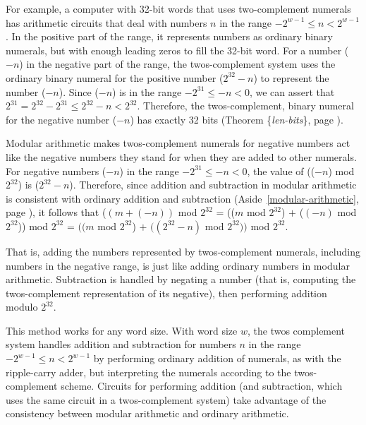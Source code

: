 For example, a computer with
32-bit words that uses
two-complement numerals has arithmetic circuits that
deal with numbers $n$ in the range $-2^{w-1} \leq n < 2^{w-1}$.
In the positive part of the range, it represents numbers as
ordinary binary numerals, but with enough leading zeros
to fill the 32-bit word.
For a number ($-n$) in the negative part of the range,
the twos-complement system uses the ordinary binary numeral
for the positive number ($2^{32}-n$) to represent the number ($-n$).
Since ($-n$) is in the range
$-2^{31} \leq -n < 0$, we can assert that
$2^{31} = 2^{32}-2^{31} \leq 2^{32}-n < 2^{32}$.
Therefore, the twos-complement, binary numeral
for the negative number ($-n$)
has exactly 32 bits (Theorem \{\emph{len-bits}\}, page \pageref{len-bits}).

Modular arithmetic makes twos-complement numerals
for negative numbers act like the negative numbers they stand for
when they are added to other numerals.
For negative numbers ($-n$) in the range $-2^{31} \leq -n < 0$,
the value of (($-n$) mod $2^{32}$) is ($2^{32}-n$).
Therefore, since addition and subtraction
in modular arithmetic is consistent with ordinary addition and subtraction
(Aside~\ref{modular-arithmetic}, page \pageref{modular-arithmetic}), it follows that
  ($(m+(-n))$ mod $2^{32}$
= (($m$ mod $2^{32}$) $+$ ($(-n)$ mod $2^{32}$)) mod $2^{32}$
= $((m$ mod $2^{32}$) $+$ $((2^{32} - n)$ mod $2^{32}))$ mod $2^{32}$.

That is, adding the numbers represented by twos-complement
numerals, including numbers in the negative range,
is just like adding ordinary numbers in modular arithmetic.
Subtraction is handled by negating a number
(that is, computing the twos-complement representation
of its negative), then performing addition modulo $2^{32}$.

This method works for any word size.
With word size $w$, the twos complement system
handles addition and subtraction for numbers $n$
in the range $-2^{w-1} \leq n < 2^{w-1}$
by performing ordinary addition of numerals,
as with the ripple-carry adder, but interpreting
the numerals according to the twos-complement scheme.
Circuits for performing addition (and subtraction, which
uses the same circuit in a twos-complement system)
take advantage of the consistency between modular arithmetic
and ordinary arithmetic.

